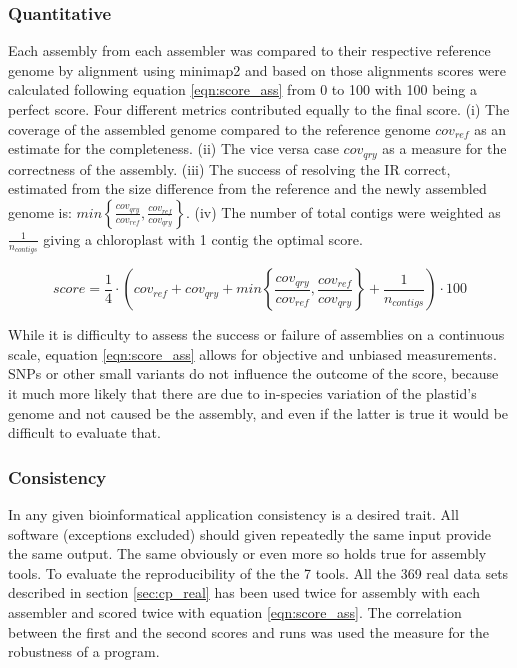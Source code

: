 \subsubsection{Quantitative}

Each assembly from each assembler was compared to their respective reference genome by alignment using
minimap2 \cite{li2018minimap2} and based on those alignments scores were calculated following equation
\ref{eqn:score_ass} from 0 to 100 with 100 being a perfect score. Four different metrics contributed equally
to the final score. (i) The coverage of the assembled genome compared to the reference genome $cov_{ref}$ as
an estimate for the completeness. (ii) The vice versa case $cov_{qry}$ as a measure for the correctness of the
assembly. (iii) The success of resolving the IR correct, estimated from the size difference from the reference
and the newly assembled genome is:
$min\left\{ \frac{cov_{qry}}{cov_{ref}}, \frac{cov_{ref}}{cov_{qry}}\right\}$.  (iv) The number of total
contigs were weighted as $\frac{1}{n_{contigs}}$ giving a chloroplast with 1 contig the optimal score.

\begin{equation}
  score = \frac{1}{4} \cdot \left( cov_{ref} +  cov_{qry} + min\left\{ \frac{cov_{qry}}{cov_{ref}}, \frac{cov_{ref}}{cov_{qry}}\right\} + \frac{1}{n_{contigs} }\right) \cdot 100
  \label{eqn:score_ass}
\end{equation}

While it is difficulty to assess the success or failure of assemblies on a continuous scale, equation
\ref{eqn:score_ass} allows for objective and unbiased measurements. SNPs or other small variants do not
influence the outcome of the score, because it much more likely that there are due to in-species variation of
the plastid's genome and not caused be the assembly, and even if the latter is true it would be difficult to
evaluate that.
  
  
\subsubsection{Consistency}

In any given bioinformatical application consistency is a desired trait. All software (exceptions excluded) should given repeatedly the same input provide the same output. The same obviously or even more so holds true for assembly tools. To evaluate the reproducibility of the the 7 tools. All the 369 real data sets described in section \ref{sec:cp_real} has been used twice for assembly with each assembler and scored twice with equation \ref{eqn:score_ass}. The correlation between the first and the second scores and runs was used the measure for the robustness of a program.

